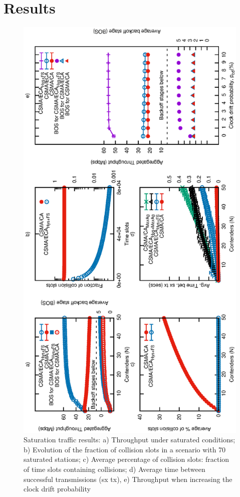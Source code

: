 \section{Results}\label{results}
	\begin{figure}[tb]
		\centering
		\includegraphics[width=0.5\linewidth,angle=-90]{figures/tonFigs/saturation-combined.eps}
		\caption{Saturation traffic results: a) Throughput under saturated conditions; b) Evolution of the fraction of collision slots in a scenario with 70 saturated stations; c) Average percentage of collision slots: fraction of time slots containing collisions; d) Average time between successful transmissions (sx tx), e) Throughput when increasing the clock drift probability}
		\label{fig:satResults}
	\end{figure}
	
	
